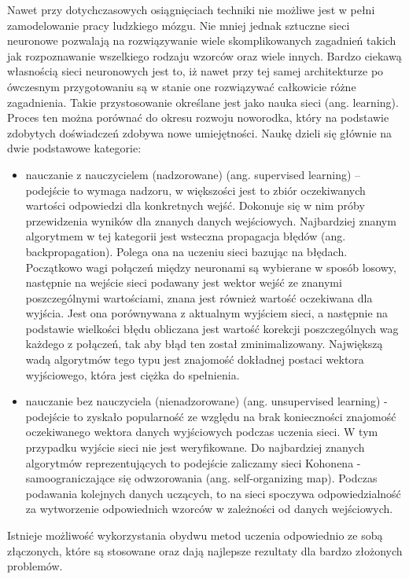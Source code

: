 Nawet przy dotychczasowych osiągnięciach techniki nie możliwe jest w pełni zamodelowanie pracy ludzkiego mózgu. Nie mniej jednak sztuczne sieci neuronowe pozwalają na rozwiązywanie wiele skomplikowanych zagadnień takich jak rozpoznawanie wszelkiego rodzaju wzorców oraz wiele innych. Bardzo ciekawą własnością sieci neuronowych jest to, iż nawet przy tej samej architekturze po ówczesnym przygotowaniu są w stanie one rozwiązywać całkowicie różne zagadnienia. Takie przystosowanie określane jest jako nauka sieci (ang. learning). Proces ten można porównać do okresu rozwoju noworodka, który na podstawie zdobytych doświadczeń zdobywa nowe umiejętności.
Naukę dzieli się głównie na dwie podstawowe kategorie:
\begin{itemize}
	\item nauczanie z nauczycielem (nadzorowane) (ang. supervised learning) –  podejście to wymaga nadzoru, w większości jest to zbiór oczekiwanych wartości odpowiedzi dla konkretnych wejść. Dokonuje się w nim próby przewidzenia wyników dla znanych danych wejściowych. Najbardziej znanym algorytmem w tej kategorii jest wsteczna propagacja błędów (ang. backpropagation). Polega ona na uczeniu sieci bazując na błędach. Początkowo wagi połączeń między neuronami są wybierane w sposób losowy, następnie na wejście sieci podawany jest wektor wejść ze znanymi poszczególnymi wartościami, znana  jest również wartość oczekiwana dla wyjścia. Jest ona porównywana z aktualnym wyjściem sieci, a następnie na podstawie wielkości błędu obliczana jest wartość korekcji poszczególnych wag każdego z połączeń, tak aby błąd ten został zminimalizowany. Największą wadą algorytmów tego typu jest znajomość dokładnej postaci wektora wyjściowego, która jest ciężka do spełnienia.
	\item nauczanie bez nauczyciela (nienadzorowane) (ang. unsupervised learning) - podejście to zyskało popularność ze względu na brak konieczności znajomość oczekiwanego wektora danych wyjściowych podczas uczenia sieci. W tym przypadku wyjście sieci nie jest weryfikowane. Do najbardziej znanych algorytmów reprezentujących to podejście zaliczamy sieci Kohonena - samoograniczające się odwzorowania (ang. self-organizing map). Podczas podawania kolejnych danych uczących, to na sieci spoczywa odpowiedzialność za wytworzenie odpowiednich wzorców w zależności od danych wejściowych.
\end{itemize}

Istnieje możliwość wykorzystania obydwu metod uczenia odpowiednio ze sobą złączonych, które są stosowane oraz dają najlepsze rezultaty dla bardzo złożonych problemów.
 
